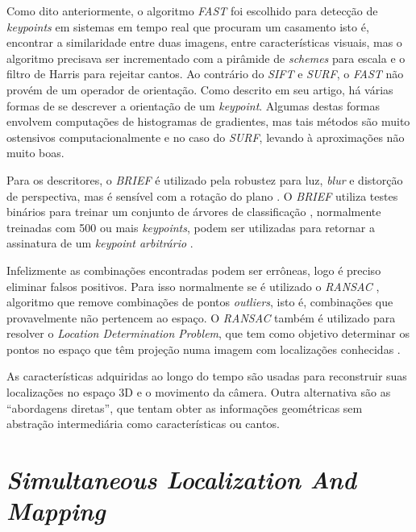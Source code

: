 Como dito anteriormente, o algoritmo \textit{FAST} foi escolhido para detecção de \textit{keypoints} em sistemas em tempo real que procuram um casamento isto é, encontrar a similaridade entre duas imagens, entre características visuais, mas o algoritmo precisava ser incrementado com a pirâmide de \textit{schemes} para escala\cite{ORB-Artigo} e o filtro de Harris\cite{ORB-Artigo} para rejeitar cantos. Ao contrário do \textit{SIFT} e \textit{SURF}, o \textit{FAST} não provém de um operador de orientação. Como descrito em seu artigo, há várias formas de se descrever a orientação de um \textit{keypoint}. Algumas destas formas envolvem computações de histogramas de gradientes, mas tais métodos são muito ostensivos computacionalmente e no caso do \textit{SURF}, levando à aproximações não muito boas.

Para os descritores, o \textit{BRIEF} é utilizado pela robustez para luz, \textit{blur} e distorção de perspectiva, mas é sensível com a rotação do plano \cite{ORB-Artigo}. O \textit{BRIEF} utiliza testes binários para treinar um conjunto de árvores de classificação \cite{ORB-Artigo}, normalmente treinadas com 500 ou mais \textit{keypoints}, podem ser utilizadas para retornar a assinatura de um \textit{keypoint arbitrário} \cite{ORB-Artigo}.

Infelizmente as combinações encontradas podem ser errôneas, logo é preciso eliminar falsos positivos. Para isso normalmente se é utilizado o \textit{RANSAC} , algoritmo que remove combinações de pontos \textit{outliers}, isto é, combinações que provavelmente não pertencem ao espaço. O \textit{RANSAC} também é utilizado para resolver o \textit{Location Determination Problem}, que tem como objetivo determinar os pontos no espaço que têm projeção numa imagem com localizações conhecidas \cite{RANSAC}.

As características adquiridas ao longo do tempo são usadas para reconstruir suas localizações no espaço 3D e o movimento da câmera. Outra alternativa são as “abordagens diretas”, que tentam obter as informações geométricas sem abstração intermediária como características ou cantos.


\section{\textit{Simultaneous Localization And Mapping}}

